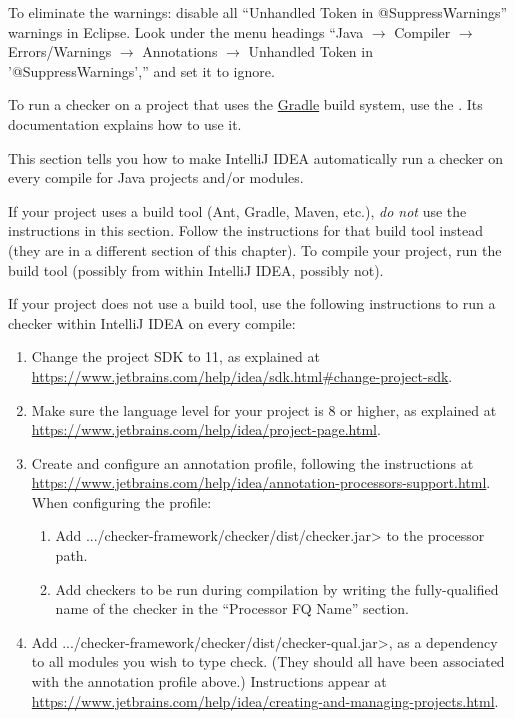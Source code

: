 To eliminate the warnings:
disable all ``Unhandled Token in @SuppressWarnings'' warnings in Eclipse.
Look under the menu headings
``Java $\rightarrow$ Compiler $\rightarrow$ Errors/Warnings $\rightarrow$
Annotations $\rightarrow$ Unhandled Token in '@SuppressWarnings',''
and set it to ignore.



To run a checker
on a project that uses the \href{https://gradle.org/}{Gradle} build system,
use the
.  Its documentation explains how to use it.




This section tells you how to make IntelliJ IDEA automatically run a
checker on every compile for Java projects and/or modules.

If your project uses a build tool (Ant, Gradle, Maven, etc.), \emph{do not}
use the instructions in this section.
Follow the instructions for that build tool instead (they are in
a different section of this chapter).  To compile your project, run the
build tool (possibly from within IntelliJ IDEA, possibly not).

If your project does not use a build tool, use the following instructions
to run a checker within IntelliJ IDEA on every compile:

\begin{enumerate}

\item Change the project SDK to 11, as explained at
  \url{https://www.jetbrains.com/help/idea/sdk.html#change-project-sdk}.

\item Make sure the language level for your project is 8 or higher, as explained at
\url{https://www.jetbrains.com/help/idea/project-page.html}.

\item Create and configure an annotation profile, following the instructions at \url{https://www.jetbrains.com/help/idea/annotation-processors-support.html}.
When configuring the profile:
\begin{enumerate}
\item Add \<.../checker-framework/checker/dist/checker.jar> to the processor path.
\item Add checkers to be run during compilation by writing the
  fully-qualified name of the checker in the ``Processor FQ Name''
  section.
\end{enumerate}

\item Add \<.../checker-framework/checker/dist/checker-qual.jar>, as a dependency to all
modules you wish to type check. (They should all have been associated with
the annotation profile above.)
Instructions appear at
\url{https://www.jetbrains.com/help/idea/creating-and-managing-projects.html}.

\end{enumerate}

